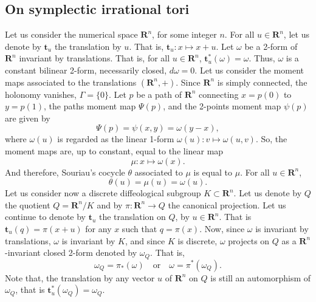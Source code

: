 \documentclass[10pt,reqno,twoside]{amsart}
\newcommand{\qmbox}[1]{\quad\mbox{#1}\quad}
\newcommand{\RR}{\mathbf{R}}
\newcommand{\et}{\mathbf{t}}
\theoremstyle{plain}
\theoremstyle{definition}
\newcommand{\article}[1]{\subsection{#1}}
\begin{document}
  \article{On symplectic irrational tori}
  \label{On-symplectic-irrational-tori}
  Let us consider the numerical space $\RR^n$,
  for some integer $n$.
  For all $u \in \RR^n$,
  let us denote by $\et_u$ the translation by $u$.
  That is,
  $\et_u : x \mapsto x + u$.
  Let $\omega$ be a 2-form of $\RR^n$ invariant by translations.
  That is,
  for all $u \in \RR^n$,
  $\et_u^*(\omega) = \omega$.
  Thus,
  $\omega$ is a constant bilinear 2-form,
  necessarily closed,
  $d\omega = 0$.
  Let us consider the moment maps associated to the translations $(\RR^n,+)$.
  Since $\RR^n$ is simply connected,
  the holonomy vanishes,
  $\Gamma = \{0\}$.
  Let $p$ be a path of $\RR^n$ connecting $x = p(0)$ to $y=p(1)$,
  the paths moment map $\Psi(p)$,
  and the 2-points moment map $\psi(p)$ are given by
  $$
    \Psi(p) = \psi(x,y) = \omega(y-x),
    $$
  where $\omega(u)$ is regarded as the linear 1-form $\omega(u) : v \mapsto \omega(u,v)$.
  So,
  the moment maps are,
  up to constant,
  equal to the linear map
  $$
    \mu : x \mapsto \omega (x).
    $$
  And therefore,
  Souriau's cocycle $\theta$ associated to $\mu$ is equal to $\mu$.
  For all $u \in \RR^n$,
  $$
    \theta(u) = \mu(u) = \omega(u).
    $$
  Let us consider now a discrete diffeological subgroup $K \subset \RR^n$.
  Let us denote by $Q$ the quotient $Q = \RR^n/K$ and by $\pi : \RR^n \to Q$ the canonical projection.
  Let us continue to denote by $\et_u$ the translation on $Q$,
  by $u \in \RR^n$.
  That is $\et_u(q) = \pi(x+u)$ for any $x$ such that $q = \pi(x)$.
  Now,
  since $\omega$ is invariant by translations,
  $\omega$ is invariant by $K$,
  and since $K$ is discrete,
  $\omega$ projects on $Q$ as a $\RR^n$-invariant closed 2-form denoted by $\omega_Q$.
  That is,
  $$
    \omega_Q = \pi_*(\omega) \qmbox{or} \omega = \pi^*(\omega_Q).
    $$
  Note that,
  the translation by any vector $u$ of $\RR^n$ on $Q$ is still an automorphism of $\omega_Q$,
  that is $\et_u^*(\omega_Q) = \omega_Q$.
\end{document}
